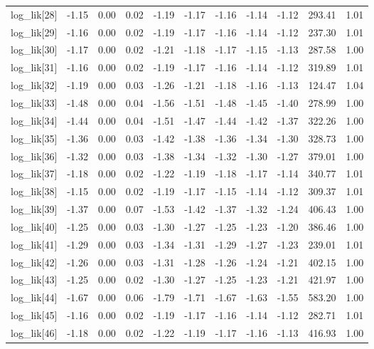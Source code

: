 \begin{table}[ht]
\begin{tabular}{rrrrrrrrrrr}
  log\_lik[28] & -1.15 & 0.00 & 0.02 & -1.19 & -1.17 & -1.16 & -1.14 & -1.12 & 293.41 & 1.01 \\ 
  log\_lik[29] & -1.16 & 0.00 & 0.02 & -1.19 & -1.17 & -1.16 & -1.14 & -1.12 & 237.30 & 1.01 \\ 
  log\_lik[30] & -1.17 & 0.00 & 0.02 & -1.21 & -1.18 & -1.17 & -1.15 & -1.13 & 287.58 & 1.00 \\ 
  log\_lik[31] & -1.16 & 0.00 & 0.02 & -1.19 & -1.17 & -1.16 & -1.14 & -1.12 & 319.89 & 1.01 \\ 
  log\_lik[32] & -1.19 & 0.00 & 0.03 & -1.26 & -1.21 & -1.18 & -1.16 & -1.13 & 124.47 & 1.04 \\ 
  log\_lik[33] & -1.48 & 0.00 & 0.04 & -1.56 & -1.51 & -1.48 & -1.45 & -1.40 & 278.99 & 1.00 \\ 
  log\_lik[34] & -1.44 & 0.00 & 0.04 & -1.51 & -1.47 & -1.44 & -1.42 & -1.37 & 322.26 & 1.00 \\ 
  log\_lik[35] & -1.36 & 0.00 & 0.03 & -1.42 & -1.38 & -1.36 & -1.34 & -1.30 & 328.73 & 1.00 \\ 
  log\_lik[36] & -1.32 & 0.00 & 0.03 & -1.38 & -1.34 & -1.32 & -1.30 & -1.27 & 379.01 & 1.00 \\ 
  log\_lik[37] & -1.18 & 0.00 & 0.02 & -1.22 & -1.19 & -1.18 & -1.17 & -1.14 & 340.77 & 1.01 \\ 
  log\_lik[38] & -1.15 & 0.00 & 0.02 & -1.19 & -1.17 & -1.15 & -1.14 & -1.12 & 309.37 & 1.01 \\ 
  log\_lik[39] & -1.37 & 0.00 & 0.07 & -1.53 & -1.42 & -1.37 & -1.32 & -1.24 & 406.43 & 1.00 \\ 
  log\_lik[40] & -1.25 & 0.00 & 0.03 & -1.30 & -1.27 & -1.25 & -1.23 & -1.20 & 386.46 & 1.00 \\ 
  log\_lik[41] & -1.29 & 0.00 & 0.03 & -1.34 & -1.31 & -1.29 & -1.27 & -1.23 & 239.01 & 1.01 \\ 
  log\_lik[42] & -1.26 & 0.00 & 0.03 & -1.31 & -1.28 & -1.26 & -1.24 & -1.21 & 402.15 & 1.00 \\ 
  log\_lik[43] & -1.25 & 0.00 & 0.02 & -1.30 & -1.27 & -1.25 & -1.23 & -1.21 & 421.97 & 1.00 \\ 
  log\_lik[44] & -1.67 & 0.00 & 0.06 & -1.79 & -1.71 & -1.67 & -1.63 & -1.55 & 583.20 & 1.00 \\ 
  log\_lik[45] & -1.16 & 0.00 & 0.02 & -1.19 & -1.17 & -1.16 & -1.14 & -1.12 & 282.71 & 1.01 \\ 
  log\_lik[46] & -1.18 & 0.00 & 0.02 & -1.22 & -1.19 & -1.17 & -1.16 & -1.13 & 416.93 & 1.00 \\ 

\end{tabular}
\end{table}
